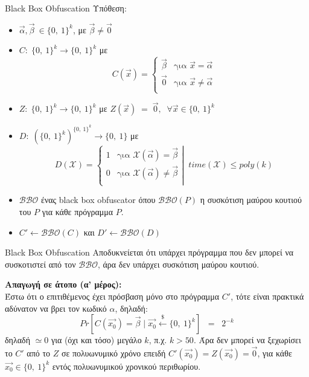 \documentclass[xcolor=dvipsnames]{beamer}
\newcommand{\lt}{\latintext}
\begin{document}
\begin{frame}{\lt Black Box Obfuscation}
Υπόθεση:
\begin{itemize}
	\item $\vec{\alpha}, \vec{\beta}\: \in \{0,\:1\}^{k}$, με $\vec{\beta} \neq \vec{0}$
	\item $C:\;\{0,\:1\}^{k} \rightarrow \{0,\:1\}^{k}$ με
	\[ 
	C(\vec{x})= \left\{
	\begin{array}{ll}
      \vec{\beta} & \text{για } \vec{x} = \vec{\alpha} \\
      \vec{0} & \text{για } \vec{x} \neq \vec{\alpha}\\
	\end{array} 
	\right. 
	\]
	\item $Z: \;\{0,\:1\}^{k} \rightarrow \{0,\:1\}^{k}$ με $Z(\vec{x})\;=\; \vec{0},\;\; \forall \vec{x} \in \{0,\:1\}^{k}$
	\item $D:\;{(\{0,\:1\}^{k})}^{\{0,\:1\}^{k}} \rightarrow \{0,\:1\}$ με
	\[ 
	D(\mathcal{X})= \left\{
	\begin{array}{ll}
      1 & \text{για } \mathcal{X}(\vec{\alpha}) = \vec{\beta} \\
      0 & \text{για } \mathcal{X}(\vec{\alpha}) \neq \vec{\beta}\\
	\end{array} 
	\right\rvert \;\; time(\mathcal{X}) \leq poly(k)
	\]
	\item $\mathcal{BBO}$ ένας {\lt black box obfuscator} όπου $\mathcal{BBO}(P)$ η συσκότιση μαύρου κουτιού του $P$ για κάθε πρόγραμμα $P$.
	\item $C' \leftarrow \mathcal{BBO}(C)$ και $D' \leftarrow \mathcal{BBO}(D)$
\end{itemize}
\end{frame}

\begin{frame}{\lt Black Box Obfuscation}
Αποδυκνείεται ότι υπάρχει πρόγραμμα που δεν μπορεί να συσκοτιστεί από τον $\mathcal{BBO}$, άρα δεν υπάρχει συσκότιση μαύρου κουτιού.\pause \\

\hfill

\textbf{Απαγωγή σε άτοπο (α' μέρος):}\\
Έστω ότι ο επιτιθέμενος έχει πρόσβαση μόνο στο πρόγραμμα $C'$, τότε είναι πρακτικά αδύνατον να βρει τον κωδικό $\alpha$, δηλαδή:
\[
	Pr[C(\vec{x_0}) = \vec{\beta} \;|\; \vec{x_0} \xleftarrow{\$} \{0,\:1\}^{k}]\;\;=\;\; 2^{-k}
\]
δηλαδή $\simeq 0$ για (όχι και τόσο) μεγάλο $k$, π.χ. $k > 50$. Άρα δεν μπορεί να ξεχωρίσει το $C'$ από το $Z$ σε πολυωνυμικό χρόνο επειδή $C'(\vec{x_0}) = Z(\vec{x_0}) = \vec{0}$, για κάθε $\vec{x_0} \in \{0,\:1\}^{k}$ εντός πολυωνυμικού χρονικού περιθωρίου.
\end{frame}
\end{document}
